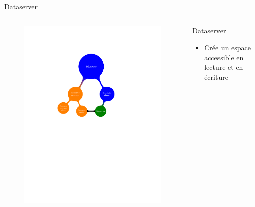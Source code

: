 \documentclass{beamer}
\begin{document}
\begin{frame}{Dataserver}
	\begin{columns}
	\begin{column}[l]{0.5\linewidth}
        \begin{figure}
            \centering
            \includegraphics[trim=5.5cm 14.3cm 2cm 6.3cm,scale=0.69]{netmap_abs.pdf}
        \end{figure}
	\end{column}
	\begin{column}[r]{0.5\linewidth}
        \begin{exampleblock}{Dataserver}
            \begin{itemize}
                \item Crée un espace accessible en lecture et en écriture


\end{itemize}
\end{exampleblock}
\end{column}
\end{columns}
\end{frame}
\end{document}
